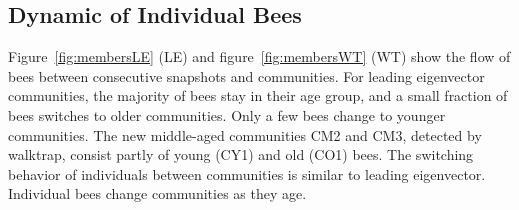 


\subsection{Dynamic of Individual Bees}
Figure~\ref{fig:membersLE} (LE) and figure~\ref{fig:membersWT} (WT) show the flow of bees between consecutive snapshots and communities.
For leading eigenvector communities, the majority of bees stay in their age group, and a small fraction of bees switches to older communities.
Only a few bees change to younger communities.
The new middle-aged communities CM2 and CM3, detected by walktrap, consist partly of young (CY1) and old (CO1) bees. The switching behavior of individuals between communities is similar to leading eigenvector.
Individual bees change communities as they age.

